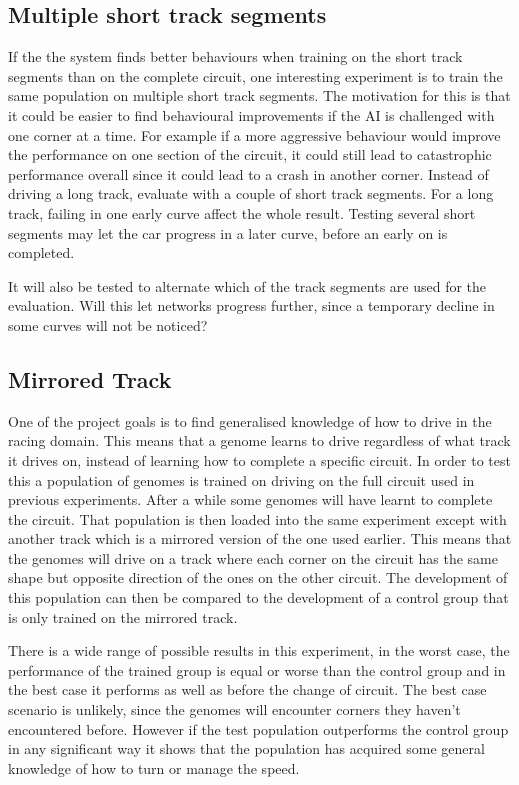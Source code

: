 \subsection{Multiple short track segments}
If the the system finds better behaviours when training on the short track segments than on the complete circuit, one interesting experiment is to train the same population on multiple short track segments. The motivation for this is that it could be easier to find behavioural improvements if the AI is challenged with one corner at a time. For example if a more aggressive behaviour would improve the performance on one section of the circuit, it could still lead to catastrophic performance overall since it could lead to a crash in another corner. 
Instead of driving a long track, evaluate with a couple of short track segments. For a long track, failing in one early curve affect the whole result. Testing several short segments may let the car progress in a later curve, before an early on is completed.

It will also be tested to alternate which of the track segments are used for the evaluation. Will this let networks progress further, since a temporary decline in some curves will not be noticed? 

\subsection{Mirrored Track}
One of the project goals is to find generalised knowledge of how to drive in the racing domain. This means that a genome learns to drive regardless of what track it drives on, instead of learning how to complete a specific circuit. In order to test this a population of genomes is trained on driving on the full circuit used in previous experiments. After a while some genomes will have learnt to complete the circuit. That population is then loaded into the same experiment except with another track which is a mirrored version of the one used earlier. This means that the genomes will drive on a track where each corner on the circuit has the same shape but opposite direction of the ones on the other circuit. The development of this population can then be compared to the development of a control group that is only trained on the mirrored track. 

There is a wide range of possible results in this experiment, in the worst case, the performance of the trained group is equal or worse than the control group and in the best case it performs as well as before the change of circuit. The best case scenario is unlikely, since the genomes will encounter corners they haven't encountered before. However if the test population outperforms the control group in any significant way it shows that the population has acquired some general knowledge of how to turn or manage the speed. 

